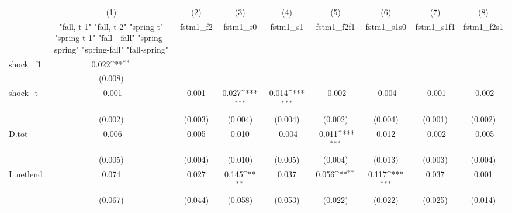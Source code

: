 {
\def\sym#1{\ifmmode^{#1}\else\(^{#1}\)\fi}
\begin{tabular}{l*{8}{c}}
\toprule
            &\multicolumn{1}{c}{(1)}&\multicolumn{1}{c}{(2)}&\multicolumn{1}{c}{(3)}&\multicolumn{1}{c}{(4)}&\multicolumn{1}{c}{(5)}&\multicolumn{1}{c}{(6)}&\multicolumn{1}{c}{(7)}&\multicolumn{1}{c}{(8)}\\
            &\multicolumn{1}{c}{  "fall, t-1" "fall, t-2" "spring t" "spring t-1"  "fall - fall" "spring - spring" "spring-fall" "fall-spring" }&\multicolumn{1}{c}{fstm1\_f2}&\multicolumn{1}{c}{fstm1\_s0}&\multicolumn{1}{c}{fstm1\_s1}&\multicolumn{1}{c}{fstm1\_f2f1}&\multicolumn{1}{c}{fstm1\_s1s0}&\multicolumn{1}{c}{fstm1\_s1f1}&\multicolumn{1}{c}{fstm1\_f2s1}\\
\midrule
shock\_f1    &       0.022\sym{**} &                     &                     &                     &                     &                     &                     &                     \\
            &     (0.008)         &                     &                     &                     &                     &                     &                     &                     \\
\addlinespace
shock\_t     &      -0.001         &       0.001         &       0.027\sym{***}&       0.014\sym{***}&      -0.002         &      -0.004         &      -0.001         &      -0.002         \\
            &     (0.002)         &     (0.003)         &     (0.004)         &     (0.004)         &     (0.002)         &     (0.004)         &     (0.001)         &     (0.002)         \\
\addlinespace
D.tot       &      -0.006         &       0.005         &       0.010         &      -0.004         &      -0.011\sym{***}&       0.012         &      -0.002         &      -0.005         \\
            &     (0.005)         &     (0.004)         &     (0.010)         &     (0.005)         &     (0.004)         &     (0.013)         &     (0.003)         &     (0.004)         \\
\addlinespace
L.netlend   &       0.074         &       0.027         &       0.145\sym{**} &       0.037         &       0.056\sym{**} &       0.117\sym{***}&       0.037         &       0.001         \\
            &     (0.067)         &     (0.044)         &     (0.058)         &     (0.053)         &     (0.022)         &     (0.022)         &     (0.025)         &     (0.014)         \\

\end{tabular}}
